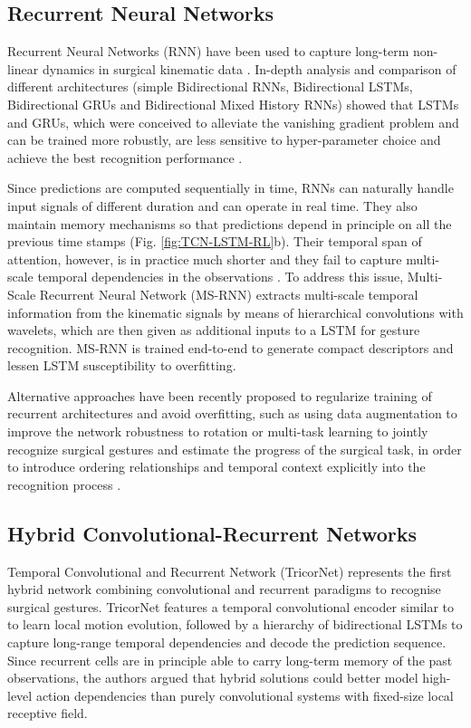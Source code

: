 \documentclass[journal]{IEEEtran}
\begin{document}
\subsection{Recurrent Neural Networks}

Recurrent Neural Networks (RNN) have been used to capture long-term non-linear dynamics in surgical kinematic data \cite{dipietro2016}. 
In-depth analysis and comparison of different architectures (simple Bidirectional RNNs, Bidirectional LSTMs, Bidirectional GRUs and Bidirectional Mixed History RNNs) showed that LSTMs and GRUs, which were conceived to alleviate the vanishing gradient problem and can be trained more robustly, are less sensitive to hyper-parameter choice and achieve the best recognition performance \cite{DiPietro2019}.

Since predictions are computed sequentially in time, RNNs can naturally handle input signals of different duration and can operate in real time.
They also maintain memory mechanisms so that predictions depend in principle on all the previous time stamps (Fig. \ref{fig:TCN-LSTM-RL}b). Their temporal span of attention, however, is in practice much shorter and they fail to capture multi-scale temporal dependencies in the observations \cite{Gurcan2019}.
To address this issue, Multi-Scale Recurrent Neural Network (MS-RNN) \cite{Gurcan2019} extracts multi-scale temporal information from the kinematic signals by means of hierarchical convolutions with wavelets, which are then given as additional inputs to a LSTM for gesture recognition. MS-RNN is trained end-to-end to generate compact descriptors and lessen LSTM susceptibility to overfitting.

Alternative approaches have been recently proposed to regularize training of recurrent architectures and avoid overfitting, such as using data augmentation to improve the network robustness to rotation \cite{Itzkovich2019} or multi-task learning to jointly recognize surgical gestures and estimate the progress of the surgical task, in order to introduce ordering relationships and temporal context explicitly into the recognition process \cite{VanAmsterdam2020}.


\subsection{Hybrid Convolutional-Recurrent Networks}

Temporal Convolutional and Recurrent Network (TricorNet) \cite{Ding2017} represents the first hybrid network combining convolutional and recurrent paradigms to recognise surgical gestures. TricorNet features a temporal convolutional encoder similar to \cite{Lea2016tcnECCV} to learn local motion evolution, followed by a hierarchy of bidirectional LSTMs to capture long-range temporal dependencies and decode the prediction sequence.
Since recurrent cells are in principle able to carry long-term memory of the past observations, the authors argued that hybrid solutions could better model high-level action dependencies than purely convolutional systems with fixed-size local receptive field.
\end{document}
